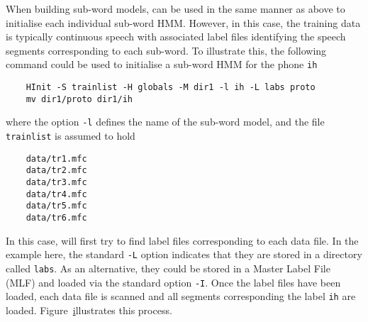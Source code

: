 
When building sub-word models,  can be used in the same manner as above to initialise
each individual sub-word HMM.  However, in this case, the training data is typically continuous
speech with associated label files identifying the speech segments corresponding to
each sub-word.  To illustrate this, the following command could be used to initialise
a sub-word HMM for the phone \texttt{ih}
\begin{verbatim}
    HInit -S trainlist -H globals -M dir1 -l ih -L labs proto
    mv dir1/proto dir1/ih
\end{verbatim}
where the option \texttt{-l} defines the name of the sub-word model, and 
the file \texttt{trainlist} is assumed to hold
\begin{verbatim}
    data/tr1.mfc
    data/tr2.mfc
    data/tr3.mfc
    data/tr4.mfc
    data/tr5.mfc
    data/tr6.mfc
\end{verbatim}
In this case,   will first try to find label
files corresponding to each data file.  In the example here, the 
standard \texttt{-L} option 
indicates that they are
stored in a directory called \texttt{labs}.  As an alternative, they
could be stored in a Master Label File (MLF) and 
loaded via the standard option \texttt{-I}.
Once the label files have been loaded, each data file is scanned and all segments
corresponding the label \texttt{ih} are loaded.  Figure~\href{f:hinitdp}
illustrates this process.

